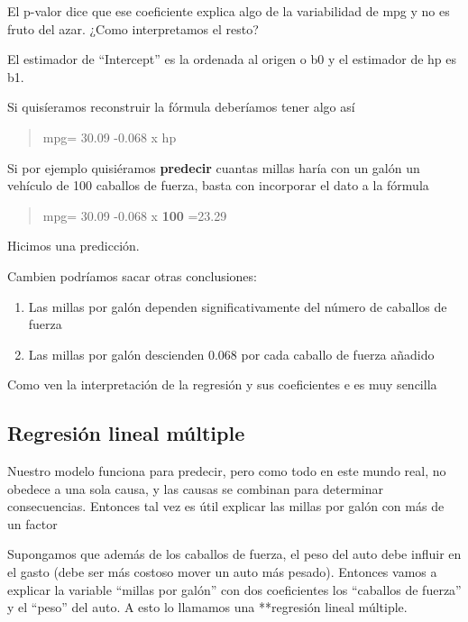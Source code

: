 \documentclass[
]{book}
\begin{document}
El p-valor dice que ese coeficiente explica algo de la variabilidad de mpg y no es fruto del azar. ¿Como interpretamos el resto?

El estimador de ``Intercept'' es la ordenada al origen o b0 y el estimador de hp es b1.

Si quisíeramos reconstruir la fórmula deberíamos tener algo así

\begin{quote}
mpg= 30.09 -0.068 x hp
\end{quote}

Si por ejemplo quisiéramos \textbf{predecir} cuantas millas haría con un galón un vehículo de 100 caballos de fuerza, basta con incorporar el dato a la fórmula

\begin{quote}
mpg= 30.09 -0.068 x \textbf{100} =23.29
\end{quote}

Hicimos una predicción.

Cambien podríamos sacar otras conclusiones:

\begin{enumerate}
\def\labelenumi{\arabic{enumi}.}
\item
  Las millas por galón dependen significativamente del número de caballos de fuerza
\item
  Las millas por galón descienden 0.068 por cada caballo de fuerza añadido
\end{enumerate}

Como ven la interpretación de la regresión y sus coeficientes e es muy sencilla

\hypertarget{regresiuxf3n-lineal-muxfaltiple}{%
\subsection{Regresión lineal múltiple}\label{regresiuxf3n-lineal-muxfaltiple}}

Nuestro modelo funciona para predecir, pero como todo en este mundo real, no obedece a una sola causa, y las causas se combinan para determinar consecuencias. Entonces tal vez es útil explicar las millas por galón con más de un factor

Supongamos que además de los caballos de fuerza, el peso del auto debe influir en el gasto (debe ser más costoso mover un auto más pesado). Entonces vamos a explicar la variable ``millas por galón'' con dos coeficientes los ``caballos de fuerza'' y el ``peso'' del auto. A esto lo llamamos una **regresión lineal múltiple.
\end{document}
